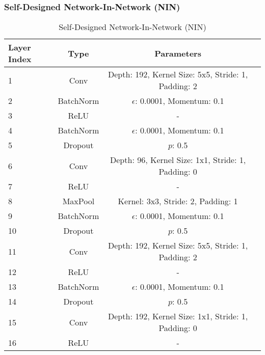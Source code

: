\documentclass[10pt,twocolumn,letterpaper]{article}
\begin{document}
\subsubsection{Self-Designed Network-In-Network (NIN)}
\begin{table}[ht]
    \caption{Self-Designed Network-In-Network (NIN)}
    \centering
    \scriptsize
    \begin{tabular}{|l|c|c|r}
        \toprule
        \toprule
        Layer Index & Type & Parameters \\
        \midrule
        \multirow{1}{0.5cm}{1} & Conv & Depth: 192, Kernel Size: 5x5, Stride: 1, Padding: 2\\
        \multirow{1}{0.5cm}{2} & BatchNorm & $\epsilon$: 0.0001, Momentum: 0.1\\
        \multirow{1}{0.5cm}{3} & ReLU & -\\
        
        \multirow{1}{0.5cm}{4} & BatchNorm & $\epsilon$: 0.0001, Momentum: 0.1\\
        \multirow{1}{0.5cm}{5} & Dropout & $p$: 0.5\\
        \multirow{1}{0.5cm}{6} & Conv & Depth: 96, Kernel Size: 1x1, Stride: 1, Padding: 0\\
        \multirow{1}{0.5cm}{7} & ReLU & -\\
        
        \multirow{1}{0.5cm}{8} & MaxPool & Kernel: 3x3, Stride: 2, Padding: 1\\
        
        \multirow{1}{0.5cm}{9} & BatchNorm & $\epsilon$: 0.0001, Momentum: 0.1\\
        \multirow{1}{0.5cm}{10} & Dropout & $p$: 0.5\\
        \multirow{1}{0.5cm}{11} & Conv & Depth: 192, Kernel Size: 5x5, Stride: 1, Padding: 2\\
        \multirow{1}{0.5cm}{12} & ReLU & -\\
        
        \multirow{1}{0.5cm}{13} & BatchNorm & $\epsilon$: 0.0001, Momentum: 0.1\\
        \multirow{1}{0.5cm}{14} & Dropout & $p$: 0.5\\
        \multirow{1}{0.5cm}{15} & Conv & Depth: 192, Kernel Size: 1x1, Stride: 1, Padding: 0\\
        \multirow{1}{0.5cm}{16} & ReLU & -\\
        

\end{tabular}
\end{table}
\end{document}

